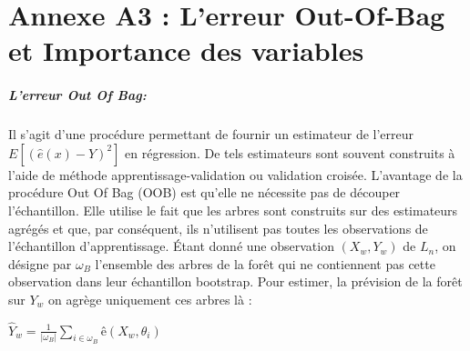 \chapter*{Annexe A3 : L'erreur Out-Of-Bag et Importance des variables}
\paragraph{L'erreur Out Of Bag:}
	Il s'agit d'une procédure permettant de fournir un estimateur de l'erreur ${E[(\hat{e}(x)-Y)^2]}$ en régression. De tels estimateurs sont souvent construits à l'aide de méthode apprentissage-validation ou validation croisée. L'avantage de la procédure Out Of Bag (OOB) est qu'elle ne nécessite pas de découper
	l'échantillon. Elle utilise le fait que les arbres sont construits sur des estimateurs agrégés et que,
	par conséquent, ils n'utilisent pas toutes les observations de l'échantillon d'apprentissage. Étant donné une observation ${(X_w,Y_w)}$ de $L_n$, on désigne par ${\omega_B}$ l'ensemble des arbres de la forêt qui
	ne contiennent pas cette observation dans leur échantillon bootstrap. Pour estimer, la prévision de
	la forêt sur ${Y_w}$ on agrège uniquement ces arbres là :
	\begin{center}
	$\hat{Y}_w = \frac{1}{|\omega_B|} \sum_{i \in \omega_B} ê(X_w,\theta_i)$
	\end{center}
